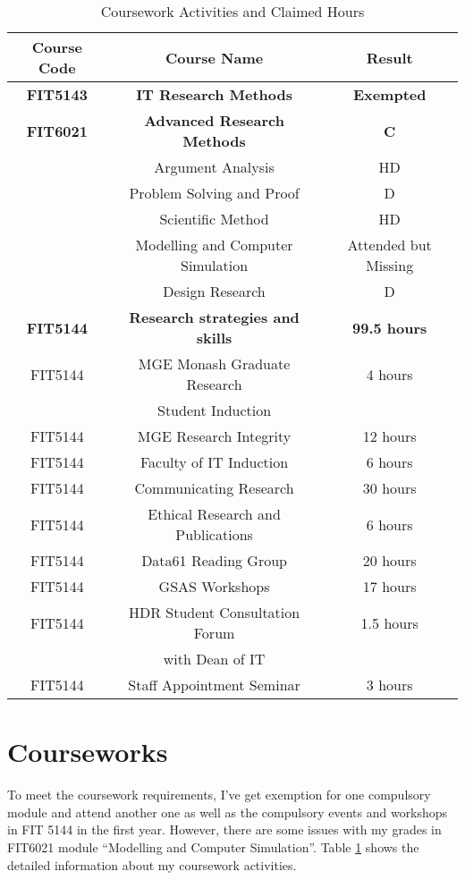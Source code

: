 \begin{table}[h]
\centering
\begin{tabular}{|c|c|c|}
\hline
\bf Course Code & \bf Course Name & \bf Result \\ \hline
\bf FIT5143 & \bf IT Research Methods & \bf Exempted \\ \hline
\bf  FIT6021 & \bf Advanced Research Methods & \bf C \\ \hline
& Argument Analysis & HD \\ \hline
& Problem Solving and Proof & D \\ \hline
& Scientific Method & HD \\ \hline
& Modelling and Computer Simulation & Attended but Missing \\ \hline
& Design Research & D \\ \hline
\bf FIT5144 & \bf Research strategies and skills  & \bf 99.5 hours \\ \hline
FIT5144 & MGE Monash Graduate Research & 4 hours \\ 
& Student Induction &  \\ \hline
FIT5144 & MGE  Research Integrity & 12 hours \\ \hline
FIT5144 & Faculty of IT Induction & 6 hours \\ \hline
FIT5144 & Communicating Research & 30 hours\\ \hline
FIT5144 & Ethical Research and Publications & 6 hours\\ \hline
FIT5144 & Data61 Reading Group & 20 hours\\ \hline
FIT5144 & GSAS Workshops & 17 hours\\ \hline
FIT5144 & HDR Student Consultation Forum & 1.5 hours\\
& with Dean of IT & \\ \hline
FIT5144 & Staff Appointment Seminar & 3 hours \\ \hline
\end{tabular}
\caption{Coursework Activities and Claimed Hours}
\label{tlb:coursework}
\end{table}

\section{Courseworks}
To meet the coursework requirements, I've get exemption for one compulsory module and attend another one as well as the compulsory events and workshops in FIT 5144 in the first year. However, there are some issues with my grades in FIT6021 module ``Modelling and Computer Simulation''. Table \ref{tlb:coursework} shows the detailed information about my coursework activities. 


